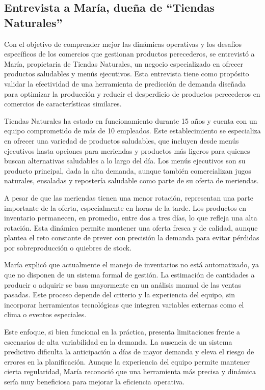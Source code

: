 \subsection{Entrevista a María, dueña de ``Tiendas Naturales''}

Con el objetivo de comprender mejor las dinámicas operativas y los desafíos específicos de los comercios que gestionan productos perecederos, se entrevistó a María, propietaria de Tiendas Naturales, un negocio especializado en ofrecer productos saludables y menús ejecutivos. Esta entrevista tiene como propósito validar la efectividad de una herramienta de predicción de demanda diseñada para optimizar la producción y reducir el desperdicio de productos perecederos en comercios de características similares.

Tiendas Naturales ha estado en funcionamiento durante 15 años y cuenta con un equipo comprometido de más de 10 empleados. Este establecimiento se especializa en ofrecer una variedad de productos saludables, que incluyen desde menús ejecutivos hasta opciones para meriendas y productos más ligeros para quienes buscan alternativas saludables a lo largo del día. Los menús ejecutivos son su producto principal, dada la alta demanda, aunque también comercializan jugos naturales, ensaladas y repostería saludable como parte de su oferta de meriendas.

\indent A pesar de que las meriendas tienen una menor rotación, representan una parte importante de la oferta, especialmente en horas de la tarde. Los productos en inventario permanecen, en promedio, entre dos a tres días, lo que refleja una alta rotación. Esta dinámica permite mantener una oferta fresca y de calidad, aunque plantea el reto constante de prever con precisión la demanda para evitar pérdidas por sobreproducción o quiebres de stock.

\indent María explicó que actualmente el manejo de inventarios no está automatizado, ya que no disponen de un sistema formal de gestión. La estimación de cantidades a producir o adquirir se basa mayormente en un análisis manual de las ventas pasadas. Este proceso depende del criterio y la experiencia del equipo, sin incorporar herramientas tecnológicas que integren variables externas como el clima o eventos especiales.

\indent Este enfoque, si bien funcional en la práctica, presenta limitaciones frente a escenarios de alta variabilidad en la demanda. La ausencia de un sistema predictivo dificulta la anticipación a días de mayor demanda y eleva el riesgo de errores en la planificación. Aunque la experiencia del equipo permite mantener cierta regularidad, María reconoció que una herramienta más precisa y dinámica sería muy beneficiosa para mejorar la eficiencia operativa.

